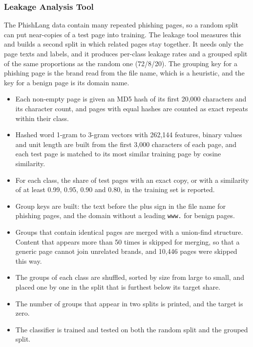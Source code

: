 \documentclass{FastFyp}
\begin{document}
\subsubsection{Leakage Analysis Tool}
\label{sec:impl-leakage}
The PhishLang data contain many repeated phishing pages, so a random split can put near-copies of a test page into training. The leakage tool measures this and builds a second split in which related pages stay together. It needs only the page texts and labels, and it produces per-class leakage rates and a grouped split of the same proportions as the random one (72/8/20). The grouping key for a phishing page is the brand read from the file name, which is a heuristic, and the key for a benign page is its domain name.
\begin{itemize}
	\item Each non-empty page is given an MD5 hash of its first 20,000 characters and its character count, and pages with equal hashes are counted as exact repeats within their class.
	\item Hashed word 1-gram to 3-gram vectors with 262,144 features, binary values and unit length are built from the first 3,000 characters of each page, and each test page is matched to its most similar training page by cosine similarity.
	\item For each class, the share of test pages with an exact copy, or with a similarity of at least 0.99, 0.95, 0.90 and 0.80, in the training set is reported.
	\item Group keys are built: the text before the plus sign in the file name for phishing pages, and the domain without a leading \texttt{www.} for benign pages.
	\item Groups that contain identical pages are merged with a union-find structure. Content that appears more than 50 times is skipped for merging, so that a generic page cannot join unrelated brands, and 10,446 pages were skipped this way.
	\item The groups of each class are shuffled, sorted by size from large to small, and placed one by one in the split that is furthest below its target share.
	\item The number of groups that appear in two splits is printed, and the target is zero.
	\item The classifier is trained and tested on both the random split and the grouped split.
\end{itemize}
\end{document}
